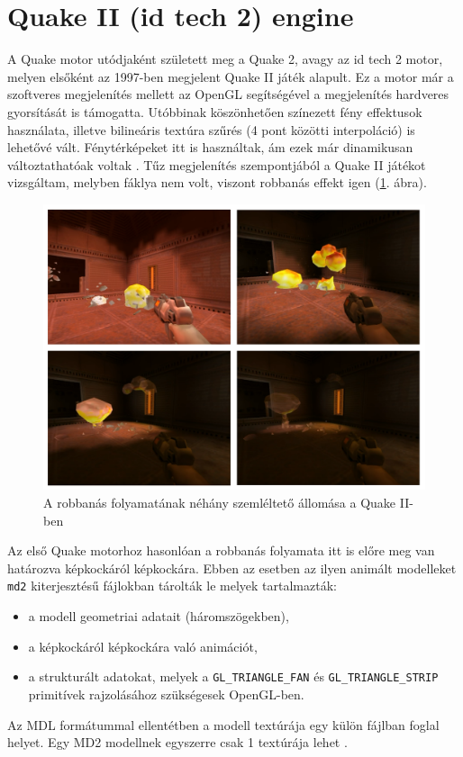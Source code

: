 \section{Quake II (id tech 2) engine}


A Quake motor utódjaként született meg a Quake 2, avagy az id tech 2 motor, melyen elsőként az 1997-ben megjelent Quake II játék alapult. Ez a motor már a szoftveres megjelenítés mellett az OpenGL segítségével a megjelenítés hardveres gyorsítását is támogatta. Utóbbinak köszönhetően színezett fény effektusok használata, illetve bilineáris textúra szűrés (4 pont közötti interpoláció) is lehetővé vált. Fénytérképeket itt is használtak, ám ezek már dinamikusan változtathatóak voltak \cite{wikiQuake2, fsQuake2}. Tűz megjelenítés szempontjából a Quake II játékot vizsgáltam, melyben fáklya nem volt, viszont robbanás effekt igen (\ref{fig:quake2explosion}. ábra).

\begin{figure}[h]
\centering
\includegraphics[width=\textwidth]{kepek/quake2explosion9.png}
\caption{A robbanás folyamatának néhány szemléltető állomása a Quake II-ben}
\label{fig:quake2explosion}
\end{figure}

Az első Quake motorhoz hasonlóan a robbanás folyamata itt is előre meg van határozva képkockáról képkockára. Ebben az esetben az ilyen animált modelleket \texttt{md2} kiterjesztésű fájlokban tárolták le melyek tartalmazták:
\begin{itemize} 
\item a modell geometriai adatait (háromszögekben),
\item a képkockáról képkockára való animációt,
\item a strukturált adatokat, melyek a \texttt{GL\_TRIANGLE\_FAN} és \texttt{GL\_TRIANGLE\_STRIP} primitívek rajzolásához szükségesek OpenGL-ben.
\end{itemize} 
Az MDL formátummal ellentétben a modell textúrája egy külön fájlban foglal helyet. Egy MD2 modellnek egyszerre csak 1 textúrája lehet \cite{MD2format}.

